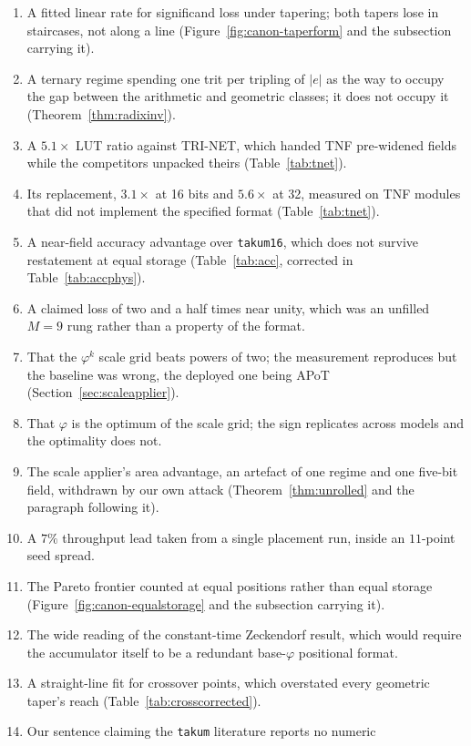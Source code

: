 \documentclass[11pt]{article}
\theoremstyle{definition}
\begin{document}
\begin{enumerate}\itemsep2pt
\item A fitted linear rate for significand loss under tapering; both tapers lose
in staircases, not along a line (Figure~\ref{fig:canon-taperform} and the
subsection carrying it).
\item A ternary regime spending one trit per tripling of $|e|$ as the way to
occupy the gap between the arithmetic and geometric classes; it does not occupy it
(Theorem~\ref{thm:radixinv}).
\item A $5.1\times$ LUT ratio against TRI-NET, which handed TNF pre-widened fields
while the competitors unpacked theirs (Table~\ref{tab:tnet}).
\item Its replacement, $3.1\times$ at 16 bits and $5.6\times$ at 32, measured on
TNF modules that did not implement the specified format (Table~\ref{tab:tnet}).
\item A near-field accuracy advantage over \texttt{takum16}, which does not
survive restatement at equal storage (Table~\ref{tab:acc}, corrected in
Table~\ref{tab:accphys}).
\item A claimed loss of two and a half times near unity, which was an unfilled
$M{=}9$ rung rather than a property of the format.
\item That the $\varphi^{k}$ scale grid beats powers of two; the measurement
reproduces but the baseline was wrong, the deployed one being
APoT~\cite{li2020apot} (Section~\ref{sec:scaleapplier}).
\item That $\varphi$ is the optimum of the scale grid; the sign replicates across
models and the optimality does not.
\item The scale applier's area advantage, an artefact of one regime and one
five-bit field, withdrawn by our own attack (Theorem~\ref{thm:unrolled} and the
paragraph following it).
\item A $7\%$ throughput lead taken from a single placement run, inside an
$11$-point seed spread.
\item The Pareto frontier counted at equal positions rather than equal storage
(Figure~\ref{fig:canon-equalstorage} and the subsection carrying it).
\item The wide reading of the constant-time Zeckendorf result, which would require
the accumulator itself to be a redundant base-$\varphi$ positional format.
\item A straight-line fit for crossover points, which overstated every geometric
taper's reach (Table~\ref{tab:crosscorrected}).
\item Our sentence claiming the \texttt{takum} literature reports no numeric

\end{enumerate}
\end{document}

